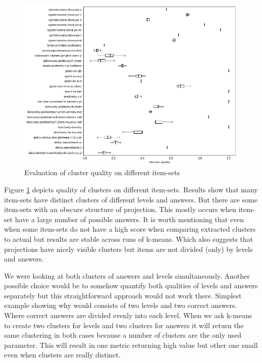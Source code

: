 \documentclass[
  digital, %
  table,   %
  nolof,     %
  nolot,     %
  nocover,
  color,
  final, %
]{fithesis3}
\begin{document}
\begin{figure}
  \includegraphics[width=\textwidth]{img/clustering_quality}
  \caption{Evaluation of cluster quality on different item-sets}
  \label{fig:clustering_quality}
\end{figure}

Figure \ref{fig:clustering_quality} depicts quality of clusters on different item-sets. Results show that many item-sets have distinct clusters of different levels and answers. But there are some item-sets with an obscure structure of projection. This mostly occurs when item-set have a large number of possible answers. It is worth mentioning that even when some item-sets do not have a high score when comparing extracted clusters to actual but results are stable across runs of k-means. Which also suggests that projections have nicely visible clusters but items are not divided (only) by levels and answers.


We were looking at both clusters of answers and levels simultaneously. Another possible choice would be to somehow quantify both qualities of levels and answers separately but this straightforward approach would not work there. Simplest example showing why would consists of two levels and two correct answers. Where correct answers are divided evenly into each level. When we ask k-means to create two clusters for levels and two clusters for answers it will return the same clustering in both cases because a number of clusters are the only used parameter. This will result in one metric returning high value but other one small even when clusters are really distinct.
\end{document}
